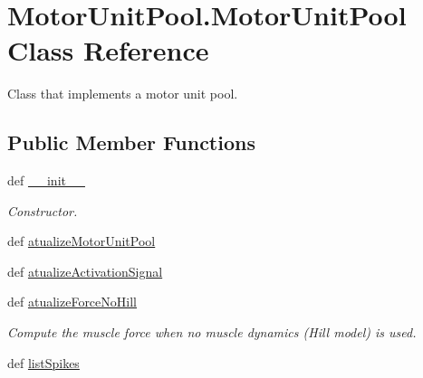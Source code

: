 \hypertarget{class_motor_unit_pool_1_1_motor_unit_pool}{\section{Motor\-Unit\-Pool.\-Motor\-Unit\-Pool Class Reference}
\label{class_motor_unit_pool_1_1_motor_unit_pool}
}


Class that implements a motor unit pool.  


\subsection*{Public Member Functions}
\begin{DoxyCompactItemize}
\item 
def \hyperlink{class_motor_unit_pool_1_1_motor_unit_pool_a627cffa9977225e58194d63a338059dc}{\-\_\-\-\_\-init\-\_\-\-\_\-}
\begin{DoxyCompactList}\small\item\em Constructor. \end{DoxyCompactList}\item 
def \hyperlink{class_motor_unit_pool_1_1_motor_unit_pool_ae525c6bba27837f09d2a767544780b0f}{atualize\-Motor\-Unit\-Pool}
\item 
def \hyperlink{class_motor_unit_pool_1_1_motor_unit_pool_a03b7c1202f680bd8ba3af9b0b06bd71c}{atualize\-Activation\-Signal}
\item 
def \hyperlink{class_motor_unit_pool_1_1_motor_unit_pool_a8fbb182559fe08eb45800271655b711f}{atualize\-Force\-No\-Hill}
\begin{DoxyCompactList}\small\item\em Compute the muscle force when no muscle dynamics (Hill model) is used. \end{DoxyCompactList}\item 
def \hyperlink{class_motor_unit_pool_1_1_motor_unit_pool_a156ffc40be4c7c37f79905fa58b017e5}{list\-Spikes}
\end{DoxyCompactItemize}
